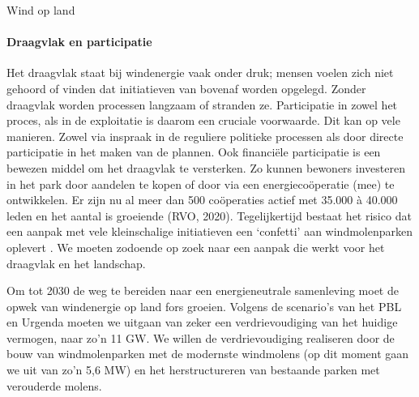 \begin{voorstel}{Wind op land}
\begin{multicols}{2}
\begin{overwegingen}
\paragraph{Draagvlak en participatie}
Het draagvlak staat bij windenergie vaak onder druk; mensen voelen zich niet gehoord of vinden dat initiatieven van bovenaf worden opgelegd. Zonder draagvlak worden processen langzaam of stranden ze. Participatie in zowel het proces, als in de exploitatie is daarom een cruciale voorwaarde. Dit kan op vele manieren. Zowel via inspraak in de reguliere politieke processen als door directe participatie in het maken van de plannen. Ook financiële participatie is een bewezen middel om het draagvlak te versterken. Zo kunnen bewoners investeren in het park door aandelen te kopen of door via een energiecoöperatie (mee) te ontwikkelen. Er zijn nu al meer dan 500 coöperaties actief met 35.000 à 40.000 leden en het aantal is groeiende (RVO, 2020). Tegelijkertijd bestaat het risico dat een aanpak met vele kleinschalige initiatieven een ‘confetti’ aan windmolenparken oplevert \parencite{college_van_rijksadviseurs_via_2019}. We moeten zodoende op zoek naar een aanpak die werkt voor het draagvlak en het landschap.

\end{overwegingen}

\begin{aanbevelingen-start}
Om tot 2030 de weg te bereiden naar een energieneutrale samenleving moet de opwek van windenergie op land fors groeien. Volgens de scenario’s van het PBL en Urgenda moeten we uitgaan van zeker een verdrievoudiging van het huidige vermogen, naar zo’n 11 GW. We willen de verdrievoudiging realiseren door de bouw van windmolenparken met de modernste windmolens (op dit moment gaan we uit van zo’n 5,6 MW) en het herstructureren van bestaande parken met verouderde molens.


\end{aanbevelingen-start}
\end{multicols}
\end{voorstel}
